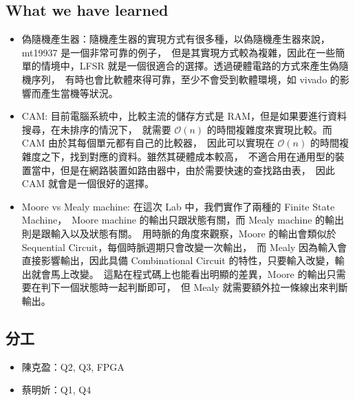\documentclass[10.5pt,compsoc,UTF8]{CjC}
\theoremstyle{mystyle}
\begin{document}
\subsection{What we have learned}
\begin{itemize}
  \item 偽隨機產生器：隨機產生器的實現方式有很多種，以偽隨機產生器來說，mt19937 是一個非常可靠的例子，\
  但是其實現方式較為複雜，因此在一些簡單的情境中，LFSR 就是一個很適合的選擇。透過硬體電路的方式來產生偽隨機序列，\
  有時也會比軟體來得可靠，至少不會受到軟體環境，如 vivado 的影響而產生當機等狀況。
  \item CAM: 目前電腦系統中，比較主流的儲存方式是 RAM，但是如果要進行資料搜尋，在未排序的情況下，\
  就需要 $\mathcal{O}(n)$ 的時間複雜度來實現比較。而 CAM 由於其每個單元都有自己的比較器，\
  因此可以實現在 $\mathcal{O}(n)$ 的時間複雜度之下，找到對應的資料。雖然其硬體成本較高，\
  不適合用在通用型的裝置當中，但是在網路裝置如路由器中，由於需要快速的查找路由表，\
  因此 CAM 就會是一個很好的選擇。
  \item Moore vs Mealy machine: 在這次 Lab 中，我們實作了兩種的 Finite State Machine，\
  Moore machine 的輸出只跟狀態有關，而 Mealy machine 的輸出則是跟輸入以及狀態有關。\
  用時脈的角度來觀察，Moore 的輸出會類似於 Sequential Circuit，每個時脈週期只會改變一次輸出，\
  而 Mealy 因為輸入會直接影響輸出，因此具備 Combinational Circuit 的特性，只要輸入改變，輸出就會馬上改變。\
  這點在程式碼上也能看出明顯的差異，Moore 的輸出只需要在判下一個狀態時一起判斷即可，\
  但 Mealy 就需要額外拉一條線出來判斷輸出。       
\end{itemize}

\subsection{分工}
\begin{itemize}
  \item 陳克盈：Q2, Q3, FPGA
  \item 蔡明妡：Q1, Q4
\end{itemize}
\end{document}
